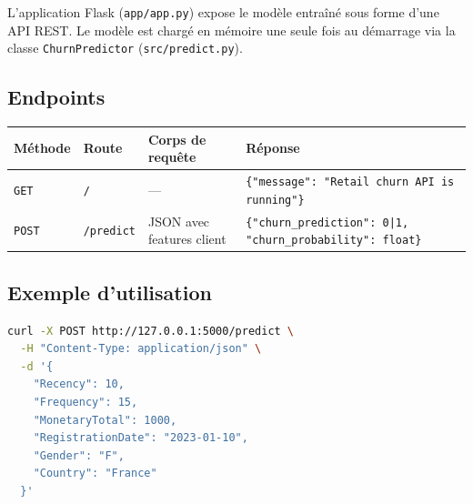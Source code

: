 \documentclass[11pt,a4paper]{article}
\begin{document}
L'application Flask (\texttt{app/app.py}) expose le modèle entraîné sous forme d'une API REST. Le modèle est chargé en mémoire une seule fois au démarrage via la classe \texttt{ChurnPredictor} (\texttt{src/predict.py}).

\begin{center}
\end{center}

\subsection{Endpoints}

\begin{center}
\begin{tabular}{L{2cm} L{2.5cm} L{4cm} L{4.5cm}}
\toprule
\textbf{Méthode} & \textbf{Route} & \textbf{Corps de requête} & \textbf{Réponse} \\
\midrule
\texttt{GET} & \texttt{/} & — & \texttt{\{"message": "Retail churn API is running"\}} \\
\texttt{POST} & \texttt{/predict} & JSON avec features client & \texttt{\{"churn\_prediction": 0|1, "churn\_probability": float\}} \\
\bottomrule
\end{tabular}
\end{center}

\subsection{Exemple d'utilisation}

\begin{lstlisting}[language=bash, caption=Exemple de requête curl]
curl -X POST http://127.0.0.1:5000/predict \
  -H "Content-Type: application/json" \
  -d '{
    "Recency": 10,
    "Frequency": 15,
    "MonetaryTotal": 1000,
    "RegistrationDate": "2023-01-10",
    "Gender": "F",
    "Country": "France"
  }'
\end{lstlisting}
\end{document}
